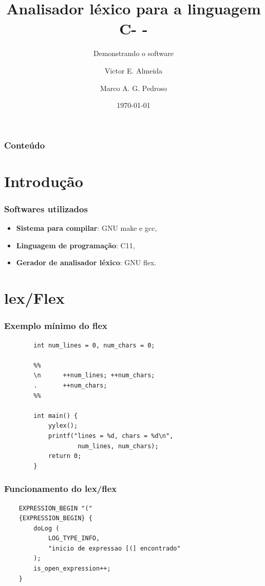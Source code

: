 \documentclass[12pt]{beamer}
\author[Grupo: c--]{Victor E. Almeida \and Marco A. G. Pedroso}
\title{Analisador léxico para a linguagem C- -}
\subtitle{Demonstrando o software}
\date{\today}
\institute{UNIOESTE}
\begin{document}
\frame{\titlepage}

\begin{frame}
\frametitle{Conteúdo}
\tableofcontents
\end{frame}

\section{Introdução}\label{Introdução}
\begin{frame}
    \frametitle{Softwares utilizados}
    \begin{itemize}
        \item \textbf{Sistema para compilar}: GNU make e gcc,
        \item \textbf{Linguagem de programação}: C11,
        \item \textbf{Gerador de analisador léxico}: GNU flex.
    \end{itemize}
\end{frame}

\section{lex/Flex}\label{lex/Flex}

\begin{frame}[t,fragile]{\insertsectionhead}
    \frametitle{Exemplo mínimo do flex}
    \begin{lstlisting}
        int num_lines = 0, num_chars = 0;

        %%
        \n      ++num_lines; ++num_chars;
        .       ++num_chars;
        %%

        int main() {
            yylex();
            printf("lines = %d, chars = %d\n",
                    num_lines, num_chars);
            return 0;
        }
    \end{lstlisting}
\end{frame}

\begin{frame}[t,fragile]{\insertsectionhead}
    \frametitle{Funcionamento do lex/flex}

    \begin{center}
        
    \begin{lstlisting}
    EXPRESSION_BEGIN "("
    {EXPRESSION_BEGIN} {
        doLog (
            LOG_TYPE_INFO,
            "inicio de expressao [(] encontrado"
        );
        is_open_expression++;
    }
    \end{lstlisting}
    \end{center}
    
\end{frame}
\end{document}
